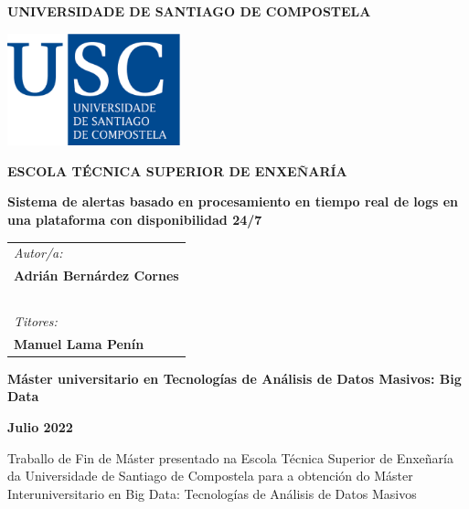 \pagestyle{empty}
\begin{center}
	{\bf\Large UNIVERSIDADE DE SANTIAGO DE COMPOSTELA}
	
	\vspace{0.5cm}
	\includegraphics[width=5cm]{figuras/logo_usc.eps}
	
	\vspace{0.5cm}
	{\bf\large ESCOLA TÉCNICA SUPERIOR DE ENXEÑARÍA}
	
	\vspace{2cm}
	{\bf\LARGE Sistema de alertas basado en procesamiento en tiempo real de logs en una plataforma con disponibilidad 24/7}
	
\end{center}

\vspace{2cm}
\hspace{4cm}\begin{tabular}{l}
	{\it\Large Autor/a:} \\
	{\bf\Large Adrián Bernárdez Cornes} \\
	~ \\
	{\it\Large Titores:} \\
	{\bf\Large Manuel Lama Penín} \\
\end{tabular}

\vspace{2cm}
\begin{center}
	{\bf\Large Máster universitario en Tecnologías de Análisis de Datos
Masivos: Big Data}
	
	\vspace{0.5cm}
	{\bf\large Julio 2022}
	
	\vspace{0.5cm}
	Traballo de Fin de Máster presentado na Escola Técnica Superior de Enxeñaría da Universidade de Santiago de Compostela para a obtención do Máster Interuniversitario en Big Data: Tecnologías de Análisis de Datos Masivos
\end{center}

